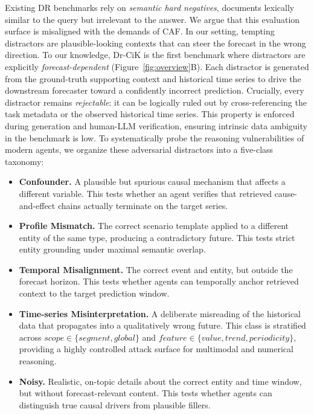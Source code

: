 \documentclass[]{servicenow}
\begin{document}
Existing DR benchmarks rely on \emph{semantic hard negatives}, documents lexically similar to the query but irrelevant to the answer. We argue that this evaluation surface is misaligned with the demands of CAF. 
In our setting, tempting distractors are plausible-looking contexts that can steer the forecast in the wrong direction.
To our knowledge, Dr-CiK is the first benchmark where distractors are explicitly \emph{forecast-dependent} (Figure~\ref{fig:overview}B). Each distractor is generated from the ground-truth supporting context and historical time series to drive the downstream forecaster toward a confidently incorrect prediction. Crucially, every distractor remains \emph{rejectable}: it can be logically ruled out by cross-referencing the task metadata or the observed historical time series. 
This property is enforced during generation and human-LLM verification, ensuring intrinsic data ambiguity in the benchmark is low.
To systematically probe the reasoning vulnerabilities of modern agents, we organize these adversarial distractors into a five-class taxonomy:
\begin{itemize}[leftmargin=*, itemsep=0.2em, topsep=0.2em, parsep=0pt, partopsep=0pt]
    \item \textbf{Confounder.} A plausible but spurious causal mechanism that affects a different variable. This tests whether an agent verifies that retrieved cause-and-effect chains actually terminate on the target series.
    \item \textbf{Profile Mismatch.} The correct scenario template applied to a different entity of the same type, producing a contradictory future. This tests strict entity grounding under maximal semantic overlap.
    \item \textbf{Temporal Misalignment.} The correct event and entity, but outside the forecast horizon. This tests whether agents can temporally anchor retrieved context to the target prediction window.
    \item \textbf{Time-series Misinterpretation.} A deliberate misreading of the historical data that propagates into a qualitatively wrong future. This class is stratified across $\mathit{scope} \in \{\mathit{segment}, \mathit{global}\}$ and $\mathit{feature} \in \{\mathit{value}, \mathit{trend}, \mathit{periodicity}\}$, providing a highly controlled attack surface for multimodal and numerical reasoning.
    \item \textbf{Noisy.} Realistic, on-topic details about the correct entity and time window, but without forecast-relevant content. This tests whether agents can distinguish true causal drivers from plausible fillers.
\end{itemize}
\end{document}
